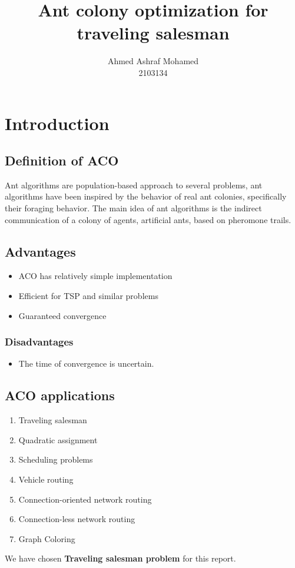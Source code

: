 \documentclass[12pt]{article}
\title{Ant colony optimization for traveling salesman}
\author{Ahmed Ashraf Mohamed \\ 2103134}
\date{}
\begin{document}
\maketitle
\section{Introduction}
\subsection{Definition of ACO}
Ant algorithms are population-based approach to several problems, ant algorithms have been inspired by the behavior of real ant colonies, specifically their foraging behavior. The main idea of ant algorithms is the indirect communication of a colony of agents, artificial ants, based on pheromone trails.

\subsection{Advantages}
\begin{itemize}
    \item ACO has relatively simple implementation
    \item Efficient for TSP and similar problems
    \item Guaranteed convergence
\end{itemize}
\subsubsection{Disadvantages}
\begin{itemize}
    \item The time of convergence is uncertain.
\end{itemize}

\subsection{ACO applications}
\begin{enumerate}
    \item Traveling salesman
    \item Quadratic assignment
    \item Scheduling problems
    \item Vehicle routing
    \item Connection-oriented network routing
    \item Connection-less network routing
    \item Graph Coloring
\end{enumerate}
We have chosen \textbf{Traveling salesman problem} for this report.
\end{document}
